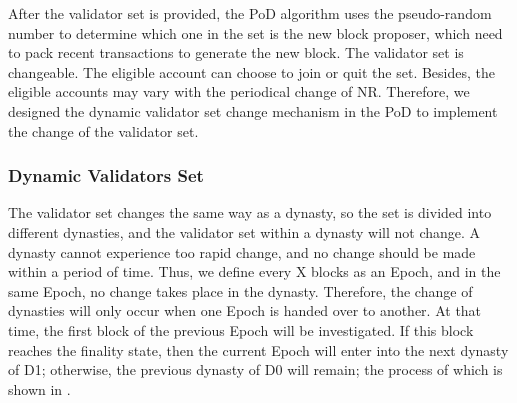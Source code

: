 
After the validator set is provided, the PoD algorithm uses the pseudo-random number to determine which one in the set is the new block proposer, which need to pack recent transactions to generate the new block. The validator set is changeable. The eligible account can choose to join or quit the set. Besides, the eligible accounts may vary with the periodical change of NR. Therefore, we designed the dynamic validator set change mechanism in the PoD to implement the change of the validator set.


\subsubsection{Dynamic Validators Set}
\label{pod:design:validators}

The validator set changes the same way as a dynasty, so the set is divided into different dynasties, and the validator set within a dynasty will not change. A dynasty cannot experience too rapid change, and no change should be made within a period of time. Thus, we define every X blocks as an Epoch, and in the same Epoch, no change takes place in the dynasty. Therefore, the change of dynasties will only occur when one Epoch is handed over to another. At that time, the first block of the previous Epoch will be investigated. If this block reaches the finality state, then the current Epoch will enter into the next dynasty of D1; otherwise, the previous dynasty of D0 will remain; the process of which is shown in .



